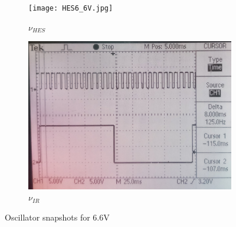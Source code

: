 \documentclass[12pt]{article}
\begin{document}
\begin{figure}[H]
	\begin{subfigure}[b]{0.5\linewidth}		
		\texttt{[image: HES6\_6V.jpg]}
		\caption{\( \nu_{HES} \)}
	\end{subfigure}
	\begin{subfigure}[b]{0.5\linewidth}						
		\includegraphics[width = \linewidth, trim = {0 0 0 0}, clip]{IR6_6V.jpg}
		\caption{\( \nu_{IR} \)}
	\end{subfigure}
	\caption{Oscillator snapshots for 6.6V}
\end{figure}
\end{document}
